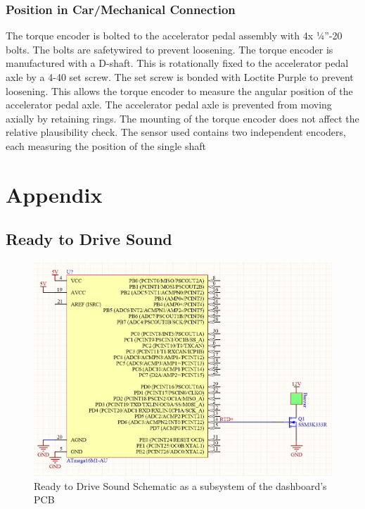 \documentclass{article}
\begin{document}
\subsubsection{Position in Car/Mechanical Connection}
The torque encoder is bolted to the accelerator pedal assembly with 4x ¼”-20 bolts. The bolts are safetywired to prevent loosening. The torque encoder is manufactured with a D-shaft. This is rotationally fixed to the accelerator pedal axle by a 4-40 set screw. The set screw is bonded with Loctite Purple to prevent loosening. This allows the torque encoder to measure the angular position of the accelerator pedal axle. The accelerator pedal axle is prevented from moving axially by retaining rings. The mounting of the torque encoder does not affect the relative plausibility check. The sensor used contains two independent encoders, each measuring the position of the single shaft 

\newpage
\setcounter{section}{10}
\section{Appendix}
\setcounter{subsection}{11}
\subsection{Ready to Drive Sound}\label{Ready to Drive}
	\begin{figure}[H]
        \includegraphics[width=\linewidth]{RTDS_Schematic_Simplified}
        \caption{Ready to Drive Sound Schematic as a subsystem of the dashboard's PCB}
\end{figure}
\end{document}
